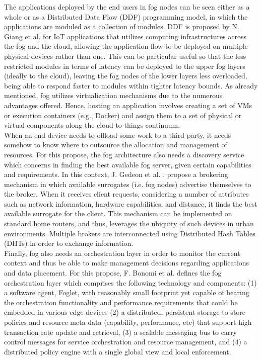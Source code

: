 \noindent\tab The applications deployed by the end users in fog nodes can be seen either as a whole or as a Distributed Data Flow (DDF) programming model, in which the applications are moduled as a collection of modules. DDF is proposed by N. Giang et al. \cite{giang2015developing} for IoT applications that utilizes computing infrastructures across the fog and the cloud, allowing the application flow to be deployed on multiple physical devices rather than one. This can be particular useful so that the less restricted modules in terms of latency can be deployed to the upper fog layers (ideally to the cloud), leaving the fog nodes of the lower layers less overloaded, being able to respond faster to modules within tighter latency bounds. As already mentioned, fog utilizes virtualization mechanisms due to the numerous advantages offered. Hence, hosting an application involves creating a set of VMs or execution containers (e.g., Docker) and assign them to a set of physical or virtual components along the cloud-to-things continuum.\\
\noindent\tab When an end device needs to offload some work to a third party, it needs somehow to know where to outsource the allocation and management of resources. For this propose, the fog architecture also needs a discovery service which concerns in finding the best available fog server, given certain capabilities and requirements. In this context, J. Gedeon et al. \cite{gedeon2017router}, propose a brokering mechanism in which available surrogates (i.e. fog nodes) advertise themselves to the broker. When it receives client requests, considering a number of attributes such as network information, hardware capabilities, and distance, it finds the best available surrogate for the client. This mechanism can be implemented on standard home routers, and thus, leverages the ubiquity of such devices in urban environments. Multiple brokers are interconnected using Distributed Hash Tables (DHTs) in order to exchange information.\\
\noindent\tab Finally, fog also needs an orchestration layer in order to monitor the current context and thus be able to make management decisions regarding applications and data placement. For this propose, F. Bonomi et al. \cite{bonomi2014fog} defines the fog orchestration layer which comprises the following technology and components: (1) a software agent, Foglet, with reasonably small footprint yet capable of bearing the orchestration functionality and performance requirements that could be embedded in various edge devices (2) a distributed, persistent storage to store policies and resource meta-data (capability, performance, etc) that support high transaction rate update and retrieval, (3) a scalable messaging bus to carry control messages for service orchestration and resource management, and (4) a distributed policy engine with a single global view and local enforcement.\\
